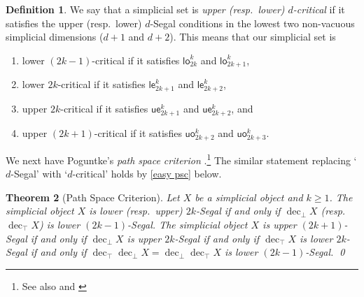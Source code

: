 \documentclass{amsart}
\newcommand{\lowev}{\mathsf{le}}
\newcommand{\lowod}{\mathsf{lo}}
\newcommand{\uppev}{\mathsf{ue}}
\newcommand{\uppod}{\mathsf{uo}}
\newcommand{\decbot}{\operatorname{dec}_\bot}
\newcommand{\dectop}{\operatorname{dec}_\top}
\newtheorem{theorem}{Theorem}
\theoremstyle{definition}
\newtheorem{definition}[theorem]{Definition}
\theoremstyle{remark}
\begin{document}
\begin{definition}\label{def d critical}
We say that a simplicial set is \emph{upper (resp.\ lower) $d$-critical} if it satisfies the upper (resp.\ lower) $d$-Segal conditions in the lowest two non-vacuous simplicial dimensions ($d+1$ and $d+2$).
This means that our simplicial set is
\begin{enumerate}
\item lower $(2k{-}1)$-critical if it satisfies $\lowod^k_{2k}$ and $\lowod^k_{2k+1}$,
\item lower $2k$-critical if it satisfies $\lowev^k_{2k+1}$ and $\lowev^k_{2k+2}$,
\item upper $2k$-critical if it satisfies $\uppev^k_{2k+1}$ and $\uppev^k_{2k+2}$, and 
\item upper $(2k{+}1)$-critical if it satisfies $\uppod^k_{2k+2}$ and $\uppod^k_{2k+3}$.
\end{enumerate}
\end{definition}

We next have Poguntke's \emph{path space criterion} \cite[Proposition 2.7]{Poguntke:HSSAKT}.\footnote{See also \cite[Theorem 6.3.2]{DyckerhoffKapranov:HSS} and \cite[Theorem 4.10]{GKT1}}
The similar statement replacing `$d$-Segal' with `$d$-critical' holds by \cref{easy psc} below.

\begin{theorem}[Path Space Criterion]\label{path space criterion}
Let $X$ be a simplicial object and $k\geq 1$.
The simplicial object 
$X$ is lower (resp.\ upper) $2k$-Segal if and only if $\decbot X$ (resp.\ $\dectop X$) is lower $(2k{-}1)$-Segal.
The simplicial object $X$ is upper $(2k{+}1)$-Segal if and only if $\decbot X$ is upper $2k$-Segal if and only if $\dectop X$ is lower $2k$-Segal if and only if $\dectop \decbot X = \decbot \dectop X$ is lower $(2k{-}1)$-Segal. \qed
\end{theorem}
\end{document}
